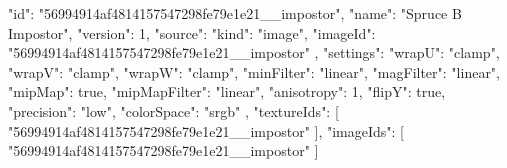 {
  "id": "56994914af4814157547298fe79e1e21__impostor",
  "name": "Spruce B Impostor",
  "version": 1,
  "source": {
    "kind": "image",
    "imageId": "56994914af4814157547298fe79e1e21__impostor"
  },
  "settings": {
    "wrapU": "clamp",
    "wrapV": "clamp",
    "wrapW": "clamp",
    "minFilter": "linear",
    "magFilter": "linear",
    "mipMap": true,
    "mipMapFilter": "linear",
    "anisotropy": 1,
    "flipY": true,
    "precision": "low",
    "colorSpace": "srgb"
  },
  "textureIds": [
    "56994914af4814157547298fe79e1e21__impostor"
  ],
  "imageIds": [
    "56994914af4814157547298fe79e1e21__impostor"
  ]
}

